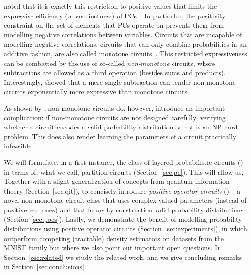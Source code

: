 \citet{zhang2020relationship} noted that it is exactly this restriction to positive values that limits the expressive efficiency (or succinctness) of PCs~\citep{martens2014expressive,decolnet2021compilation}. In particular, the positivity constraint on the set of elements that PCs operate on prevents them from modelling negative correlations between variables.
Circuits that are incapable of modelling negative correlations, \ie circuits that can only combine probabilities in an additive fashion, are also called monotone circuits~\citep{shpilka2010arithmetic}.
This restricted expressiveness can be combatted by the use of so-called \textit{non-monotone} circuits, where subtractions are allowed as a third operation (besides sums and products). Interestingly, \citet{valiant1979negation} showed that a mere single subtraction can render non-monotone circuits exponentially more expressive than monotone circuits.

As shown by \citet{harviainen2023inference}, non-monotone circuits do, however, introduce an important complication: if non-monotone circuits are not designed carefully, verifying whether a circuit encodes a valid probability distribution or not is an NP-hard problem. This does also render learning the parameters of a circuit practically infeasible.




We will formulate, in a first instance, the class of layered probabilistic circuits (\cf \citet{peharz2019random,peharz2020einsum}) in terms of, what we call, partition circuits (Section~\ref{sec:pc}).
This will allow us, Together with a slight generalization of concepts from quantum information theory (Section~\ref{sec:qit}),
to concisely introduce \textit{positive operator circuits} (\pocs) --
a novel non-monotone circuit class that uses complex valued parameters (instead of positive real ones) and that forms by construction valid probability distributions (Section~\ref{sec:pocs}).
Lastly, we demonstrate the benefit of modelling probability distributions using positive operator circuits (Section~\ref{sec:experiments}), in which \pocs outperform competing (tractable) density estimators on datasets from the MNIST family but where we also point out important open questions.
In Section~\ref{sec:related} we study the related work, and we give concluding remarks in Section~\ref{sec:conclusions}.



